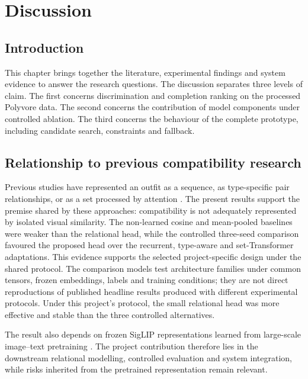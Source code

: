 \chapter{Discussion}

\section{Introduction}

This chapter brings together the literature, experimental findings and system
evidence to answer the research questions. The discussion separates three
levels of claim. The first concerns discrimination and completion ranking on
the processed Polyvore data. The second concerns the contribution of model
components under controlled ablation. The third concerns the behaviour of the
complete prototype, including candidate search, constraints and fallback.

\section{Relationship to previous compatibility research}

Previous studies have represented an outfit as a sequence, as type-specific
pair relationships, or as a set processed by attention
\parencite{han2017bilstm,vasileva2018typeaware,sarkar2023outfittransformer}.
The present results support the premise shared by these approaches:
compatibility is not adequately represented by isolated visual similarity.
The non-learned cosine and mean-pooled baselines were weaker than the relational
head, while the controlled three-seed comparison favoured the proposed head
over the recurrent, type-aware and set-Transformer adaptations. This evidence
supports the selected project-specific design under the shared protocol. The
comparison models test architecture families under common tensors, frozen
embeddings, labels and training conditions; they are not direct reproductions
of published headline results produced with different experimental protocols.
Under this project's protocol, the small relational head was more effective and
stable than the three controlled alternatives.

The result also depends on frozen SigLIP representations learned from
large-scale image--text pretraining \parencite{zhai2023siglip}. The project
contribution therefore lies in the downstream relational modelling, controlled
evaluation and system integration, while risks inherited from the pretrained
representation remain relevant.

